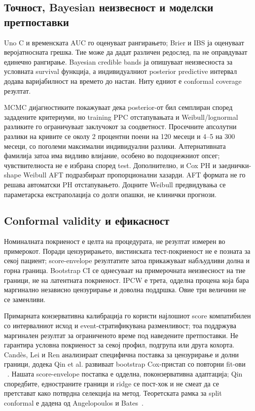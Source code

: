 \documentclass[12pt]{article}
\begin{document}
\subsection{Точност, Bayesian неизвесност и моделски претпоставки}

Uno C и временската AUC го оценуваат рангирањето; Brier и IBS ја оценуваат
веројатносната грешка. Тие може да дадат различен редослед, па не оправдуваат
единечно рангирање. Bayesian credible bands ја опишуваат неизвесноста за
условната survival функција, а индивидуалниот posterior predictive интервал
додава варијабилност на времето до настан. Ниту едниот е conformal coverage
резултат.

MCMC дијагностиките покажуваат дека posterior-от бил семплиран според зададените
критериуми, но training PPC отстапувањата и Weibull/lognormal разликите го
ограничуваат заклучокот за соодветност. Просечните апсолутни разлики на кривите
се околу 2 процентни поени на 120 месеци и 4--5 на 300 месеци, со поголеми
максимални индивидуални разлики. Алтернативната фамилија затоа има видливо
влијание, особено во подоцнежниот опсег; чувствителноста не е избрана според
test. Дополнително, и Cox PH и заеднички-shape Weibull AFT подразбираат
пропорционални хазарди. AFT формата не го решава автоматски PH отстапувањето.
Доцните Weibull предвидувања се параметарска екстраполација со долги опашки,
не клинички прогнози.

\subsection{Conformal validity и ефикасност}

Номиналната покриеност е целта на процедурата, не резултат измерен во примерокот.
Поради цензурирањето, вистинската тест-покриеност не е позната за секој пациент;
score-envelope резултатите затоа прикажуваат набљудливи долна и горна граница.
Bootstrap CI се однесуваат на примерочната неизвесност на тие граници, не на
латентната покриеност. IPCW е трета, одделна процена која бара маргинално
независно цензурирање и доволна поддршка. Овие три величини не се заменливи.

Примарната конзервативна калибрација го користи најлошиот score компатибилен со
интервалниот исход и event-стратификувана разменливост; тоа поддржува маргинален
резултат за ограниченото време под наведените претпоставки. Не гарантира
условна покриеност за секој профил, подгрупа или друга кохорта. Candès, Lei и
Ren анализираат специфична поставка за цензурирање и долни граници, додека
Qin et al. развиваат bootstrap Cox-пристап со повторни fit-ови
~\cite{candes2023,qin2025}. Нашата score-envelope постапка е одделна, поконзервативна
адаптација; Qin споредбите, едностраните граници и ridge се пост-хок и не смеат
да се претстават како потврдна селекција на метод. Теоретската рамка за split
conformal е дадена од Angelopoulos и Bates~\cite{angelopoulos2023}.
\end{document}
